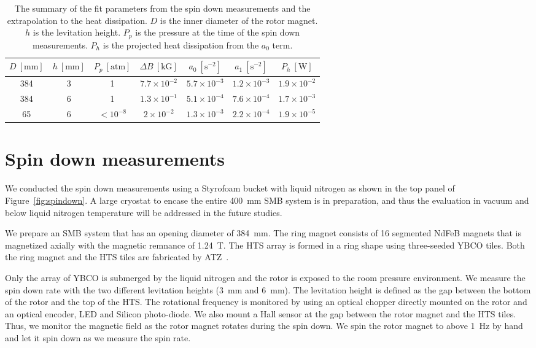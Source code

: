 \documentclass[iournal]{IEEEtran}
\begin{document}
\begin{table}[tb]
  \renewcommand{\arraystretch}{1.3}
  \caption{The summary of the fit parameters from the spin down measurements and the extrapolation to the heat dissipation.
    $D$ is the inner diameter of the rotor magnet.
    $h$ is the levitation height.
    $P_p$ is the pressure at the time of the spin down measurements.
    $P_h$ is the projected heat dissipation from the $a_0$ term.}
  \label{tab:fitpar}
  \centering
  \begin{tabular}{|c|c|c|c|c|c|c|} %
    \hline
    $D \ [\mbox{mm}]$ & $h \ [\mbox{mm}]$& $P_p \ [\mbox{atm}]$ & $\Delta B \ [\mbox{kG}]$ &$a_0 \ [\mbox{s}^{-2}]$ & $a_1 \ [\mbox{s}^{-2}]$  & $P_h \ [\mbox{W}]$\\ \hline \hline
    384 & 3  & 1  & $7.7\times10^{-2}$ & $5.7\times10^{-3}$  & $1.2\times10^{-3}$ & $1.9\times10^{-2}$\\ \hline
    384 & 6  &  1 & $1.3\times10^{-1}$ & $5.1\times10^{-4}$ & $7.6\times10^{-4}$ & $1.7\times10^{-3}$\\ \hline
    65 & 6   &  $<10^{-8}$ & $2\times10^{-2}$ & $1.3\times10^{-3}$ & $2.2\times10^{-4}$ & $1.9\times10^{-5}$\\ \hline
  \end{tabular}
\end{table}

\section{Spin down measurements}
We conducted the spin down measurements using a Styrofoam bucket with liquid nitrogen as shown in the top panel of Figure~\ref{fig:spindown}.
A large cryostat to encase the entire 400~mm SMB system is in preparation, and thus the evaluation in vacuum and below liquid nitrogen temperature will be addressed in the future studies.

We prepare an SMB system that has an opening diameter of 384~mm.
The ring magnet consists of 16 segmented NdFeB magnets that is magnetized axially with the magnetic remnance of 1.24~T.
The HTS array is formed in a ring shape using three-seeded YBCO tiles.
Both the ring magnet and the HTS tiles are fabricated by ATZ~\cite{atz}.

Only the array of YBCO is submerged by the liquid nitrogen and the rotor is exposed to the room pressure environment.
We measure the spin down rate with the two different levitation heights (3~mm and 6~mm).
The levitation height is defined as the gap between the bottom of the rotor and the top of the HTS.
The rotational frequency is monitored by using an optical chopper directly mounted on the rotor and an optical encoder, LED and Silicon photo-diode.
We also mount a Hall sensor at the gap between the rotor magnet and the HTS tiles.
Thus, we monitor the magnetic field as the rotor magnet rotates during the spin down.
We spin the rotor magnet to above 1~Hz by hand and let it spin down as we measure the spin rate.
\end{document}
